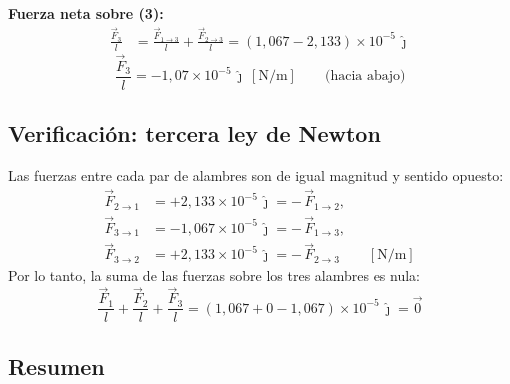 \documentclass[12pt,letterpaper]{article}
\begin{document}
\noindent\textbf{Fuerza neta sobre (3):}
\begin{align*}
    \frac{\vec{F}_3}{l} &= \frac{\vec{F}_{1\to3}}{l} + \frac{\vec{F}_{2\to3}}{l}
                         = (1{,}067 - 2{,}133)\times10^{-5}\,\hat{\jmath}
\end{align*}
\[
    \boxed{\frac{\vec{F}_3}{l} = -1{,}07\times10^{-5}\,\hat{\jmath}\ [\text{N/m}]
    \qquad\text{(hacia abajo)}}
\]

\subsection*{Verificaci\'on: tercera ley de Newton}

\noindent Las fuerzas entre cada par de alambres son de igual magnitud y sentido opuesto:
\begin{align*}
    \vec{F}_{2\to1} &= +2{,}133\times10^{-5}\,\hat{\jmath} = -\,\vec{F}_{1\to2},\\
    \vec{F}_{3\to1} &= -1{,}067\times10^{-5}\,\hat{\jmath} = -\,\vec{F}_{1\to3},\\
    \vec{F}_{3\to2} &= +2{,}133\times10^{-5}\,\hat{\jmath} = -\,\vec{F}_{2\to3}
    \qquad [\text{N/m}]
\end{align*}
Por lo tanto, la suma de las fuerzas sobre los tres alambres es nula:
\[
    \frac{\vec{F}_1}{l} + \frac{\vec{F}_2}{l} + \frac{\vec{F}_3}{l}
    = (1{,}067 + 0 - 1{,}067)\times10^{-5}\,\hat{\jmath} = \vec{0}
\]

\subsection*{Resumen}
\end{document}
